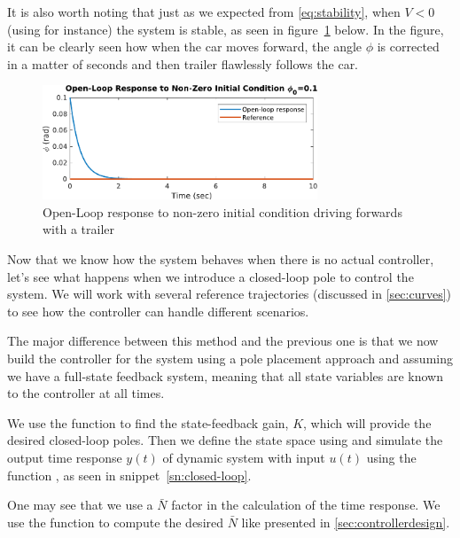 It is also worth noting that just as we expected from \eqref{eq:stability}, when $V < 0$ (using  for instance) the system is stable, as seen in figure~\ref{fig:curve-open-loop-stable} below. In the figure, it can be clearly seen how when the car moves forward, the angle $\phi$ is corrected in a matter of seconds and then trailer flawlessly follows the car.
\begin{figure}[H]
	\centering
	\includegraphics[width=0.73\textwidth]{images/stable-open-loop}
	\caption{Open-Loop response to non-zero initial condition driving forwards with a trailer}
	\label{fig:curve-open-loop-stable}
\end{figure}

Now that we know how the system behaves when there is no actual controller, let's see what happens when we introduce a closed-loop pole to control the system. We will work with several reference trajectories (discussed in \cref{sec:curves}) to see how the controller can handle different scenarios.

The major difference between this method and the previous one is that we now  build the controller for the system using a pole placement approach and assuming we have a full-state feedback system, meaning that all state variables are known to the controller at all times.

We use the function  to find the state-feedback gain, $K$, which will provide the desired closed-loop poles. Then we define the state space using  and simulate the output time response $y(t)$ of dynamic system with input $u(t)$ using the function , as seen in snippet~\ref{sn:closed-loop}.

One may see that we use a $\bar{N}$ factor in the calculation of the time response. We use the function  to compute the desired $\bar{N}$ like presented in \cref{sec:controllerdesign}.

